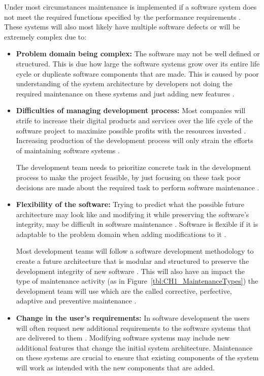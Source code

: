 Under most circumstances maintenance is implemented if a software system does not meet the required functions specified by the performance requirements \cite{Ogheneovo2014, Sneed2004}. These systems will also most likely have multiple software defects or will be extremely complex due to:
\begin{itemize}
    \item \textbf{Problem domain being complex:} The software may not be well defined or structured. This is due how large the software systems grow over its entire life cycle or duplicate software components that are made. This is caused by poor understanding of the system architecture by developers not doing the required maintenance on these systems and just adding new features \cite{Galster2019, Booch1986}.
    \item \textbf{Difficulties of managing development process:} Most companies will strife to increase their digital products and services over the life cycle of the software project to maximize possible profits with the resources invested \cite{Niu2018}. Increasing production of the development process will only strain the efforts of maintaining software systems \cite{Sneed2004}.\par The development team needs to prioritize concrete task in the development process to make the project feasible, by just focusing on these task poor decisions are made about the required task to perform software maintenance \cite{Galster2019, Ogheneovo2014, Lenarduzzi2017}. 
    \item \textbf{Flexibility of the software:} Trying to predict what the possible future architecture may look like and modifying it while preserving the software's integrity, may be difficult in software maintenance \cite{Garlan1999}. Software is flexible if it is adaptable to the problem domain when adding modifications to it \cite{Ogheneovo2014}.\par Most development teams will follow a software development methodology to create a future architecture that is modular and structured to preserve the development integrity of new software \cite{Vijayasarathy2016, Rehman2018}. This will also have an impact the type of maintenance activity (as in Figure~\ref{tbl:CH1_MaintenanceTypes}) the development team will use which are the called corrective, perfective, adaptive and preventive maintenance \cite{FrancisThamburaj2017, Hasan2012, Stojanov2017, Snipes2018}.
    \item \textbf{Change in the user's requirements:} In software development the users will often request new additional requirements to the software systems that are delivered to them \cite{Ogheneovo2014}. Modifying software systems may include new additional features that change the initial system architecture. Maintenance on these systems are crucial to ensure that existing components of the system will work as intended with the new components that are added.
\end{itemize}

